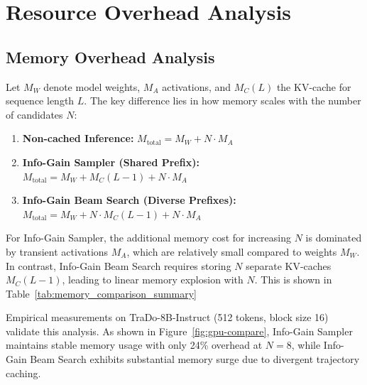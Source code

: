 \section{Resource Overhead Analysis}
\subsection{Memory Overhead Analysis}
\label{appendix:memory}

Let $M_W$ denote model weights, $M_A$ activations, and $M_C(L)$ the KV-cache for sequence length $L$. The key difference lies in how memory scales with the number of candidates $N$:



\begin{enumerate}
    \item \textbf{Non-cached Inference:} $M_{\text{total}} = M_W + N \cdot M_A$
    \item \textbf{Info-Gain Sampler (Shared Prefix):} $M_{\text{total}} = M_W + M_C(L-1) + N \cdot M_A$
    \item \textbf{Info-Gain Beam Search (Diverse Prefixes):} $M_{\text{total}} = M_W + N \cdot M_C(L-1) + N \cdot M_A$
\end{enumerate}

For Info-Gain Sampler, the additional memory cost for increasing $N$ is dominated by transient activations $M_A$, which are relatively small compared to weights $M_W$. In contrast, Info-Gain Beam Search requires storing $N$ separate KV-caches $M_C(L-1)$, leading to linear memory explosion with $N$. This is shown in Table~\ref{tab:memory_comparison_summary}

\begin{table}[h]
\centering
\caption{Memory efficiency comparison under KV-caching.}
\label{tab:memory_comparison_summary}
\end{table}

Empirical measurements on TraDo-8B-Instruct (512 tokens, block size 16) validate this analysis. As shown in Figure~\ref{fig:gpu-compare}, Info-Gain Sampler maintains stable memory usage with only 24\% overhead at $N=8$, while Info-Gain Beam Search exhibits substantial memory surge due to divergent trajectory caching.
